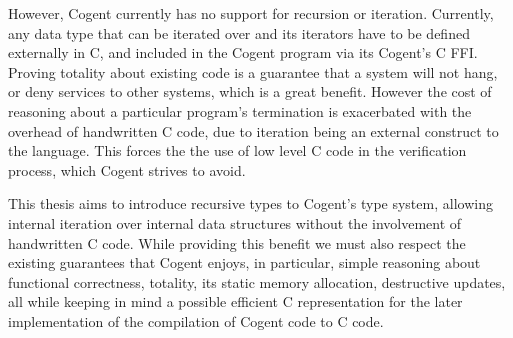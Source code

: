 However, Cogent currently has no support for recursion or iteration.
Currently, any data type that can be iterated over and its iterators have to be defined externally in C,
  and included in the Cogent program via its Cogent's C FFI.
Proving totality about existing code is a guarantee that a system will not hang,
  or deny services to other systems, which is a great benefit.
However the cost of reasoning about a particular program's termination is
  exacerbated with the overhead of handwritten C code, due to iteration being an external construct to the language.
This forces the the use of low level C code in the verification process, which Cogent strives to avoid.

This thesis aims to introduce recursive types to Cogent's type system, allowing internal iteration over
  internal data structures without the involvement of handwritten C code.
While providing this benefit we must also respect the existing guarantees that Cogent enjoys,
  in particular, simple reasoning about functional correctness, totality,
  its static memory allocation, destructive updates, all while keeping in mind
  a possible efficient C representation for the later implementation of the compilation of Cogent
  code to C code.
